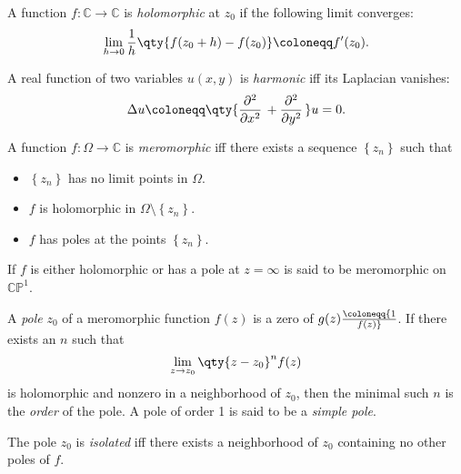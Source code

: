 \begin{definition}[Holomorphic]

A function \(f:{\mathbb{C}}\to {\mathbb{C}}\) is \emph{holomorphic} at
\(z_0\) if the following limit converges:
\begin{align*}  
\lim_{h\to 0} {1\over h} \qty{f(z_0 + h) - f(z_0)} \coloneqq f'(z_0)
.\end{align*}

\end{definition}

\begin{definition}[Harmonic]

A real function of two variables \(u(x, y)\) is \emph{harmonic} iff its
Laplacian vanishes:
\begin{align*}  
\Delta u \coloneqq\qty{{\frac{\partial ^2}{\partial x^2}\,} + {\frac{\partial ^2}{\partial y^2}\,}}u = 0
.\end{align*}

\end{definition}

\begin{definition}[Meromorphic]

A function \(f:\Omega\to{\mathbb{C}}\) is \emph{meromorphic} iff there
exists a sequence \(\left\{{z_n}\right\}\) such that

\begin{itemize}
\tightlist
\item
  \(\left\{{z_n}\right\}\) has no limit points in \(\Omega\).
\item
  \(f\) is holomorphic in \(\Omega\setminus\left\{{z_n}\right\}\).
\item
  \(f\) has poles at the points \(\left\{{z_n}\right\}\).
\end{itemize}

If \(f\) is either holomorphic or has a pole at \(z=\infty\) is said to
be meromorphic on \({\mathbb{CP}}^1\).

\end{definition}

\begin{definition}

A \emph{pole} \(z_0\) of a meromorphic function \(f(z)\) is a zero of
\(g(z) \coloneqq{1\over f(z)}\). If there exists an \(n\) such that
\begin{align*}  
\lim_{z\to z_0}\qty{z-z_0}^nf(z)
\end{align*}
is holomorphic and nonzero in a neighborhood of \(z_0\), then the
minimal such \(n\) is the \emph{order} of the pole. A pole of order 1 is
said to be a \emph{simple pole}.

The pole \(z_0\) is \emph{isolated} iff there exists a neighborhood of
\(z_0\) containing no other poles of \(f\).

\end{definition}

